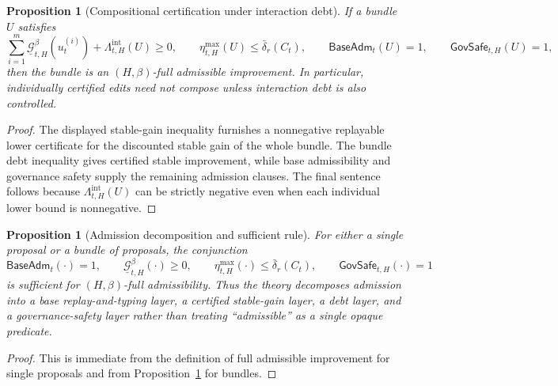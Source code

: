 \documentclass[11pt]{article}
\newtheorem{proposition}[theorem]{Proposition}
\theoremstyle{definition}
\newcommand{\1}{\mathbf{1}}
\begin{document}
\begin{proposition}[Compositional certification under interaction debt]\label{prop:interaction_debt}
If a bundle $U$ satisfies
\[
\sum_{i=1}^m \underline{\mathcal G}_{t,H}^{\beta}(u_t^{(i)}) + \Lambda_{t,H}^{\mathrm{int}}(U)\ge 0,
\qquad
\eta_{t,H}^{\max}(U)\le \bar\delta_r(C_t),
\qquad
\mathsf{BaseAdm}_t(U)=1,
\qquad
\mathsf{GovSafe}_{t,H}(U)=1,
\]
then the bundle is an $(H,\beta)$-full admissible improvement. In particular, individually certified edits need not compose unless interaction debt is also controlled.
\end{proposition}

\begin{proof}
The displayed stable-gain inequality furnishes a nonnegative replayable lower certificate for the discounted stable gain of the whole bundle. The bundle debt inequality gives certified stable improvement, while base admissibility and governance safety supply the remaining admission clauses. The final sentence follows because $\Lambda_{t,H}^{\mathrm{int}}(U)$ can be strictly negative even when each individual lower bound is nonnegative.
\end{proof}

\begin{proposition}[Admission decomposition and sufficient rule]\label{prop:master_admissibility}
For either a single proposal or a bundle of proposals, the conjunction
\[
\mathsf{BaseAdm}_t(\cdot)=1,\qquad
\underline{\mathcal G}_{t,H}^{\beta}(\cdot)\ge 0,\qquad
\eta_{t,H}^{\max}(\cdot)\le \bar\delta_r(C_t),\qquad
\mathsf{GovSafe}_{t,H}(\cdot)=1
\]
is sufficient for $(H,\beta)$-full admissibility. Thus the theory decomposes admission into a base replay-and-typing layer, a certified stable-gain layer, a debt layer, and a governance-safety layer rather than treating ``admissible'' as a single opaque predicate.
\end{proposition}

\begin{proof}
This is immediate from the definition of full admissible improvement for single proposals and from Proposition~\ref{prop:interaction_debt} for bundles.
\end{proof}
\end{document}
